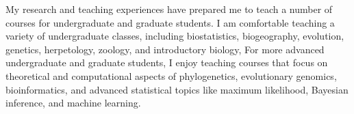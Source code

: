My research and teaching experiences have prepared me to teach a number of
courses for undergraduate and graduate students.
I am comfortable teaching a variety of undergraduate classes, including
biostatistics,
biogeography,
evolution,
genetics,
herpetology,
zoology,
and
introductory biology,
For more advanced undergraduate and graduate students, I enjoy teaching courses
that focus on theoretical and computational aspects of
phylogenetics,
evolutionary genomics,
bioinformatics,
and
advanced statistical topics like
maximum likelihood,
Bayesian inference,
and
machine learning.

